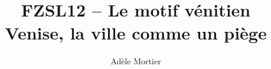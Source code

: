 \documentclass[a4paper,10pt]{article}
\title{FZSL12 -- Le motif vénitien\\
	Venise, la ville comme un piège}
\author{Adèle Mortier}
\begin{document}
\maketitle


\medskip


\end{document}
